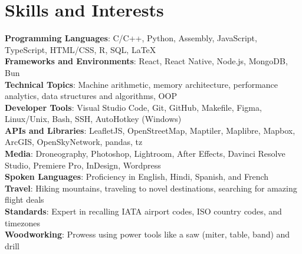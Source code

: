 \documentclass[letterpaper,11pt]{article}
\begin{document}
%
\section{Skills and Interests}
 \begin{itemize}[leftmargin=0in, label={}]
    \small{\item{
     \textbf{Programming Languages}{: C/C++, Python, Assembly, JavaScript, TypeScript, HTML/CSS, R, SQL, LaTeX} \\
     \textbf{Frameworks and Environments}{: React, React Native, Node.js, MongoDB, Bun} \\
     \textbf{Technical Topics}{: Machine arithmetic, memory architecture, performance analytics, data structures and algorithms, OOP} \\
     \textbf{Developer Tools}{: Visual Studio Code, Git, GitHub, Makefile, Figma, Linux/Unix, Bash, SSH, AutoHotkey (Windows)} \\
     \textbf{APIs and Libraries}{: LeafletJS, OpenStreetMap, Maptiler, Maplibre, Mapbox, ArcGIS, OpenSkyNetwork, pandas, tz} \\
     \textbf{Media}{: Droneography, Photoshop, Lightroom, After Effects, Davinci Resolve Studio, Premiere Pro, InDesign, Wordpress} \\
     \textbf{Spoken Languages}{: Proficiency in English, Hindi, Spanish, and French} \\
     \textbf{Travel}{: Hiking mountains, traveling to novel destinations, searching for amazing flight deals} \\
     \textbf{Standards}{: Expert in recalling IATA airport codes, ISO country codes, and timezones} \\
     \textbf{Woodworking}{: Prowess using power tools like a saw (miter, table, band) and drill} \\
     
    }}
 \end{itemize}
\end{document}
